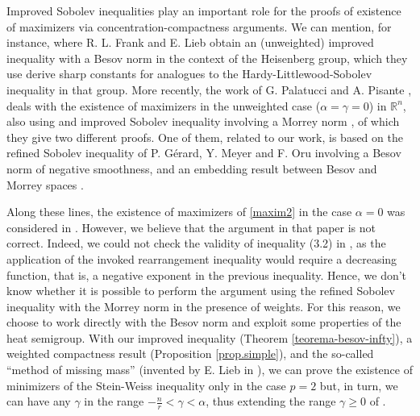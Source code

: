 \documentclass[12pt]{amsart}
\newcommand {\R}{\mathbb{R}}
\begin{document}
\medskip

Improved Sobolev inequalities play an important role for the proofs of existence of maximizers via concentration-compactness arguments. 
We can mention, for instance, \cite[Lemma 4.4]{Frank-Lieb2} where R. L. Frank and E. Lieb obtain an (unweighted) improved inequality with a Besov norm  in the context of the Heisenberg group, which they use derive sharp constants for analogues to the Hardy-Littlewood-Sobolev inequality in that group. 
More recently, the work of G. Palatucci 
and  A. Pisante \cite{PP},  deals with the existence of maximizers in
the unweighted case ($\alpha= \gamma=0$) in $\R^n$, also using and improved Sobolev inequality involving  
a Morrey norm  \cite[Theorem 1.1]{PP}, of which they give two different proofs. One of them, related to our work, is based on the refined
Sobolev inequality of P. Gérard, Y. Meyer and F. Oru \cite{GMO} involving a
Besov norm of negative smoothness, and an embedding result between  Besov
and Morrey spaces \cite[Lemma 3.4]{PP}. 

\medskip

Along these lines, the existence of maximizers of \eqref{maxim2} in the case $\alpha=0$ 
was considered in \cite{Yang}. However, we believe that the  argument in that paper is not correct. 
Indeed, we could not check the validity of inequality (3.2) in 
\cite{Yang}, as the application of the invoked rearrangement inequality would require a decreasing function, that is, a negative 
exponent in the previous inequality. Hence, we don't know whether it is possible to perform the argument
using the refined Sobolev inequality with the Morrey norm in the presence of weights. For this reason, we choose to work directly with the Besov norm and exploit some properties of the heat semigroup. With our improved inequality (Theorem \ref{teorema-besov-infty}), a weighted compactness result  (Proposition \ref{prop.simple}), and the so-called ``method of missing mass'' (invented by E. Lieb in \cite{Lieb}), we can prove the existence of minimizers of the Stein-Weiss inequality only in the case $p=2$ but, in turn, we can have any $\gamma$ in the range $-\frac{n}{r}<\gamma < \alpha$, thus extending the range $\gamma\ge 0$ of \cite{Lieb}.

\medskip
\end{document}
